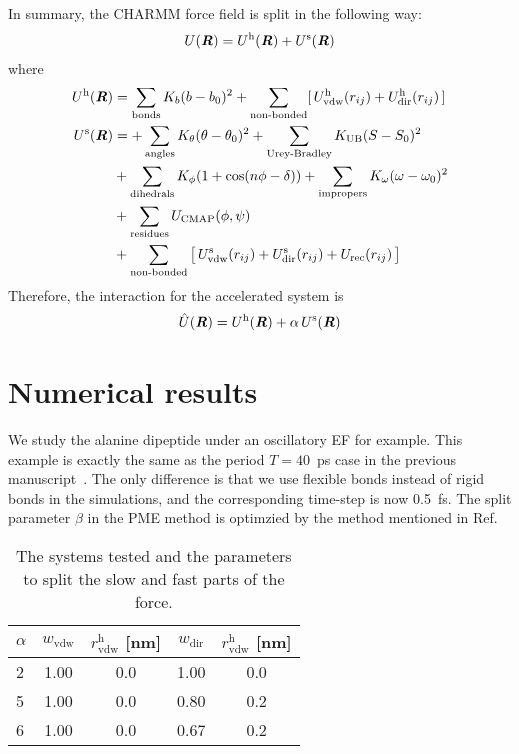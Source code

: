 \documentclass[aip,jcp,a4paper,reprint,onecolumn]{revtex4-1}
\newcommand{\vect}[1]{\textbf{\textit{#1}}}
\newcommand{\hard}{\textrm{h}}
\newcommand{\soft}{\textrm{s}}
\newcommand{\vdw}{\textrm{vdw}}
\newcommand{\dir}{\textrm{dir}}
\newcommand{\rec}{\textrm{rec}}
\begin{document}
\noindent
In summary, the CHARMM force field is split in the following way:
\begin{align}
  U(\vect R) = U^\hard(\vect R) + U^\soft(\vect R)
\end{align}
where
\begin{align}
  U^\hard(\vect R) &=
  \sum_{\textrm{bonds}} K_b(b-b_0)^2 +
  \sum_{\textrm{non-bonded}} [\,U_{\vdw}^\hard (r_{ij}) + U_{\dir}^\hard (r_{ij})\,] \\\nonumber
  U^\soft(\vect R) &=
  +\sum_{\textrm{angles}} K_\theta (\theta - \theta_0)^2
  +\sum_{\textrm{Urey-Bradley}} K_{\textrm{UB}} (S - S_0)^2\\\nonumber
  &
  +\sum_{\textrm{dihedrals}} K_\phi( 1+\cos(n\phi - \delta)) 
  +\sum_{\textrm{impropers}} K_\omega (\omega - \omega_0)^2\\ \nonumber
  &
  +\sum_{\textrm{residues}} U_{\textrm{CMAP}}(\phi, \psi) \\
  &
  +\sum_{\textrm{non-bonded}}
  \big[\,U^\soft_{\vdw}(r_{ij})
  + U^\soft_{\dir}(r_{ij})
  + U_{\rec}(r_{ij})\,\big]  
\end{align}
Therefore, the interaction for the accelerated system is
\begin{align}
  \hat U(\vect R) = U^\hard(\vect R) + \alpha\,U^\soft(\vect R)  
\end{align}


\section{Numerical results}
\noindent
We study the alanine dipeptide under an oscillatory EF for example.
This example is exactly the same as the period $T=40$~ps case in the previous
manuscript~\cite{wang2013exploring}. The only difference is that we use
flexible bonds instead of rigid bonds in the simulations, and the corresponding
time-step is now 0.5~fs. The split parameter $\beta$ in the PME method is optimzied by
the method mentioned in Ref.~\cite{wang2010optimizing}\\

\begin{table}
  \centering
  \begin{tabular*}{0.48\textwidth}{@{\extracolsep{\fill}}lcccc}
    \hline\hline
    $\alpha$ & $w_\vdw$ & $r^\hard_\vdw$ [nm] & $w_\dir$ & $r^\hard_\vdw$ [nm] \\\hline
    2           & 1.00     & 0.0   & 1.00    & 0.0\\
    5           & 1.00     & 0.0   & 0.80    & 0.2\\
    6           & 1.00     & 0.0   & 0.67    & 0.2\\
    \hline\hline
  \end{tabular*}
  \caption{The systems tested and the parameters to split the slow and fast parts of the force.}
  \label{tab:tmp1}
\end{table}
\end{document}
